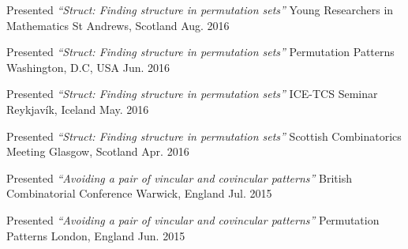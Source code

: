 


\begin{cventries}


\cventrypresentation
  {Presented \textit{``Struct: Finding structure in permutation sets''}} %
  {Young Researchers in Mathematics} %
  {St Andrews, Scotland} %
  {Aug. 2016} %


\cventrypresentation
  {Presented \textit{``Struct: Finding structure in permutation sets''}} %
  {Permutation Patterns} %
  {Washington, D.C, USA} %
  {Jun. 2016} %


\cventrypresentation
  {Presented \textit{``Struct: Finding structure in permutation sets''}} %
  {ICE-TCS Seminar} %
  {Reykjavík, Iceland} %
  {May. 2016} %


\cventrypresentation
  {Presented \textit{``Struct: Finding structure in permutation sets''}} %
  {Scottish Combinatorics Meeting} %
  {Glasgow, Scotland} %
  {Apr. 2016} %


\cventrypresentation
  {Presented \textit{``Avoiding a pair of vincular and covincular patterns''}} %
  {British Combinatorial Conference} %
  {Warwick, England} %
  {Jul. 2015} %


\cventrypresentation
  {Presented \textit{``Avoiding a pair of vincular and covincular patterns''}} %
  {Permutation Patterns} %
  {London, England} %
  {Jun. 2015} %


\end{cventries}
